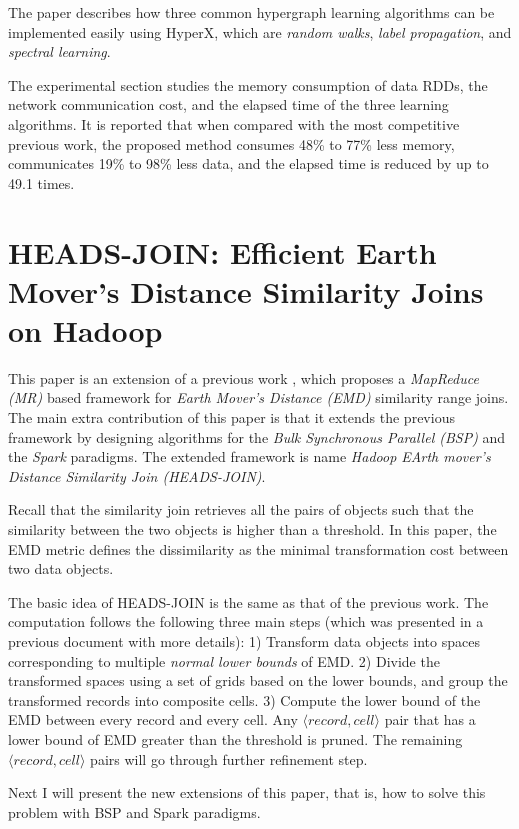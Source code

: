 \documentclass[paper=a4, fontsize=18pt]{article} %
\numberwithin{equation}{section} %
\numberwithin{figure}{section} %
\numberwithin{table}{section} %
\begin{document}
The paper describes how three common hypergraph learning algorithms can be implemented easily using HyperX, which are \emph{random walks}, \emph{label propagation}, and \emph{spectral learning}.

The experimental section studies the memory consumption of data RDDs, the network communication cost, and the elapsed time of the three learning algorithms. It is reported that when compared with the most competitive previous work, the proposed method consumes 48\% to 77\% less memory, communicates 19\% to 98\% less data, and the elapsed time is reduced by up to 49.1 times.

\section{HEADS-JOIN: Efficient Earth Mover's Distance Similarity Joins on Hadoop \cite{HZBCW16}}

This paper is an extension of a previous work \cite{HZBC14}, which proposes a \emph{MapReduce (MR)} based framework for \emph{Earth Mover's Distance (EMD)} similarity range joins. The main extra contribution of this paper is that it extends the previous framework by designing algorithms for the \emph{Bulk Synchronous Parallel (BSP)} and the \emph{Spark} paradigms. The extended framework is name \emph{Hadoop EArth mover's Distance Similarity Join (HEADS-JOIN)}.

Recall that the similarity join retrieves all the pairs of objects such that the similarity between the two objects is higher than a threshold. In this paper, the EMD metric defines the dissimilarity as the minimal transformation cost between two data objects.

The basic idea of HEADS-JOIN is the same as that of the previous work. The computation follows the following three main steps (which was presented in a previous document with more details):
1) Transform data objects into spaces corresponding to multiple \emph{normal lower bounds} of EMD.
2) Divide the transformed spaces using a set of grids based on the lower bounds, and group the transformed records into composite cells.
3) Compute the lower bound of the EMD between every record and every cell. Any $\langle record, cell \rangle$ pair that has a lower bound of EMD greater than the threshold is pruned. The remaining $\langle record, cell \rangle$ pairs will go through further refinement step.

Next I will present the new extensions of this paper, that is, how to solve this problem with BSP and Spark paradigms.
\end{document}

